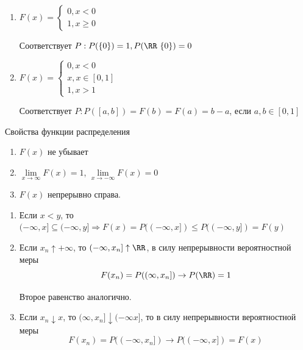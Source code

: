 \begin{example}{}{}
    \begin{enumerate}
        \item
            \(
                F(x) = \begin{cases}
                    0, x < 0
                    \\
                    1, x \geq 0
                \end{cases}
            \)

            Соответствует \( P : P( \{ 0 \} ) = 1, P( \RR \ \{ 0 \} ) = 0 \)
        \item
            \(
                F(x) = \begin{cases}
                    0, x < 0
                    \\
                    x, x \in [0, 1]
                    \\
                    1, x > 1
                \end{cases}
            \)

            Соответствует \( P : P( [a, b] ) = F(b) = F(a) = b - a \), если \( a, b \in [0, 1] \)
    \end{enumerate}
\end{example}

\begin{lemma}{Свойства функции распределения}{}
    \begin{enumerate}
        \item
            \( F(x) \) не убывает
        \item
            \( \lim\limits_{x \to \infty} F(x) = 1 \), \( \lim\limits_{x \to -\infty} F(x) = 0 \)
        \item
            \( F(x) \) непрерывно справа.
    \end{enumerate}
\end{lemma}

\begin{enumerate}
    \item
        Если \( x < y \),
        то \( (-\infty, x] \subseteq (-\infty, y] \Rightarrow F(x) = P( (-\infty, x] ) \leq P( (-\infty, y] ) = F(y) \)
    \item
        Если \( x_n \uparrow +\infty \),
        то \( (-\infty, x_n] \uparrow \RR \),
        в силу непрерывности вероятностной меры
        \[
            F(x_n) = P( (\infty, x_n] ) \to P(\RR) = 1
        \]

        Второе равенство аналогично.
    \item
        Если \( x_n \downarrow x \), то \( (\infty, x_n] \downarrow (-\infty x] \),
        то в силу непрерывности вероятностной меры
        \[
            F(x_n) = P( (-\infty, x_n] ) \to P ( (-\infty, x] ) = F(x)
        \]
\end{enumerate}

